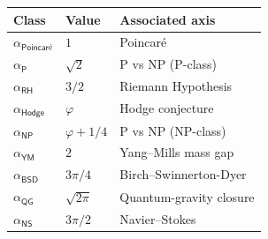 \documentclass[11pt,a4paper]{amsart}
\theoremstyle{plain}
\theoremstyle{definition}
\begin{document}
\begin{center}
\footnotesize
\renewcommand{\arraystretch}{1.15}
\begin{tabular}{@{}lll@{}}
\toprule
\textbf{Class} & \textbf{Value} & \textbf{Associated axis} \\
\midrule
$\alpha_{\textsf{Poincar\'e}}$ & $1$              & Poincar\'e~\cite{perelman2003} \\
$\alpha_{\textsf{P}}$          & $\sqrt{2}$       & P vs NP (P-class) \\
$\alpha_{\textsf{RH}}$         & $3/2$            & Riemann Hypothesis \\
$\alpha_{\textsf{Hodge}}$      & $\varphi$        & Hodge conjecture \\
$\alpha_{\textsf{NP}}$         & $\varphi + 1/4$  & P vs NP (NP-class) \\
$\alpha_{\textsf{YM}}$         & $2$              & Yang--Mills mass gap \\
$\alpha_{\textsf{BSD}}$        & $3\pi/4$         & Birch--Swinnerton-Dyer \\
$\alpha_{\textsf{QG}}$         & $\sqrt{2\pi}$    & Quantum-gravity closure \\
$\alpha_{\textsf{NS}}$         & $3\pi/2$         & Navier--Stokes \\
\bottomrule
\end{tabular}
\end{center}
\end{document}
